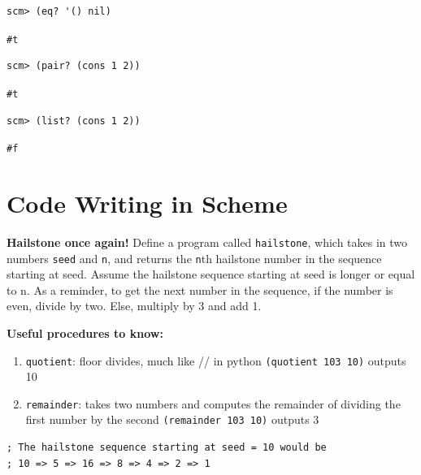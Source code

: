 \documentclass{exam}
\begin{document}
\begin{questions}
\begin{blocksection}
\begin{lstlisting}
scm> (eq? '() nil)
\end{lstlisting}
\begin{solution}[.25in]
\texttt{\#t}
\end{solution}

\begin{lstlisting}
scm> (pair? (cons 1 2))
\end{lstlisting}
\begin{solution}[.25in]
\texttt{\#t}
\end{solution}

\begin{lstlisting}
scm> (list? (cons 1 2))
\end{lstlisting}
\begin{solution}[.25in]
\texttt{\#f}
\end{solution}
\end{blocksection}

\section{Code Writing in Scheme}

\begin{blocksection}
\question \textbf{Hailstone once again!} Define a program called \texttt{hailstone}, which takes in two numbers \texttt{seed} and \texttt{n}, and returns the \texttt{n}th hailstone number in the sequence starting at seed. Assume the hailstone sequence starting at seed is longer or equal to n. As a reminder, to get the next number in the sequence, if the number is even, divide by two. Else, multiply by 3 and add 1. \newline

\textbf{Useful procedures to know:} \newline
\begin{enumerate}
\item \texttt{quotient}: floor divides, much like // in python
\subitem \texttt{(quotient 103 10)} outputs 10
\item \texttt{remainder}: takes two numbers and computes the remainder of dividing the first number by the second
\subitem \texttt{(remainder 103 10)} outputs 3
\end{enumerate}

\begin{nonsol}
\begin{lstlisting}
; The hailstone sequence starting at seed = 10 would be
; 10 => 5 => 16 => 8 => 4 => 2 => 1


\end{lstlisting}
\end{nonsol}
\end{blocksection}
\end{questions}
\end{document}
